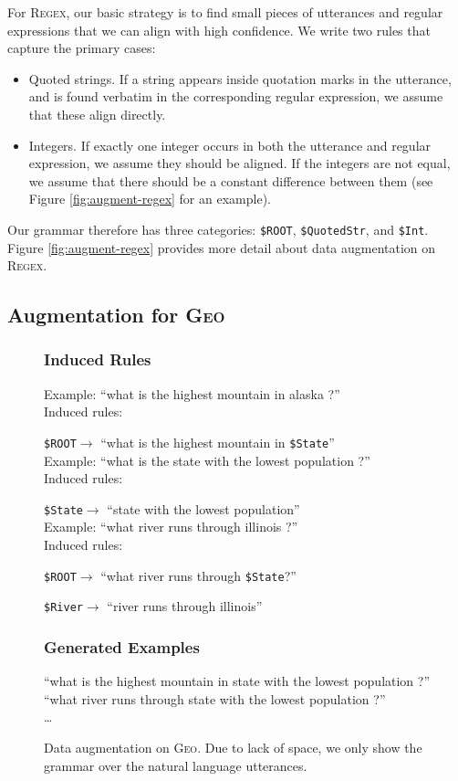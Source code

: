 \documentclass[11pt,letterpaper]{article}
\newcommand{\regex}{\textsc{Regex}\xspace}
\newcommand{\geo}{\textsc{Geo}\xspace}
\newcommand{\catroot}{\texttt{\$ROOT}\xspace}
\newcommand{\catstate}{\texttt{\$State}\xspace}
\newcommand{\catriver}{\texttt{\$River}\xspace}
\begin{document}
For \regex, our basic strategy is to find small pieces of 
utterances and regular expressions that we can align with high confidence.
We write two rules that capture the primary cases:
\begin{itemize}
  \item Quoted strings.  If a string appears inside quotation marks
    in the utterance, and is found verbatim in the corresponding
    regular expression, we assume that these align directly.
  \item Integers.  If exactly one integer occurs in both the 
    utterance and regular expression, we assume they should be aligned.
    If the integers are not equal, we assume that there should be
    a constant difference between them 
    (see Figure \ref{fig:augment-regex} for an example).
\end{itemize}

Our grammar therefore has three categories: 
\texttt{\$ROOT}, \texttt{\$QuotedStr}, and \texttt{\$Int}.
Figure \ref{fig:augment-regex}
provides more detail about data augmentation on \regex.

\subsection{Augmentation for \geo}
\begin{figure}[t] 
\small
\begin{framed}
\footnotesize
\subsubsection*{Induced Rules}
Example: ``what is the highest mountain in alaska ?''\\
Induced rules:

\quad \catroot $\to$ ``what is the highest mountain in \catstate ''\\

Example: ``what is the state with the lowest population ?''\\
Induced rules:

\quad \catstate $\to$ ``state with the lowest population''\\

Example: ``what river runs through illinois ?''\\
Induced rules:

\quad \catroot $\to$ ``what river runs through \catstate ?''

\quad \catriver $\to$ ``river runs through illinois''

\subsubsection*{Generated Examples} 
``what is the highest mountain in state with the lowest population ?'' \\
``what river runs through state with the lowest population ?'' \\
\dots
\end{framed}
\caption{Data augmentation on \geo.  Due to lack of space,
we only show the grammar over the natural language utterances.}
\label{fig:augment-geo}
\end{figure}
\end{document}
